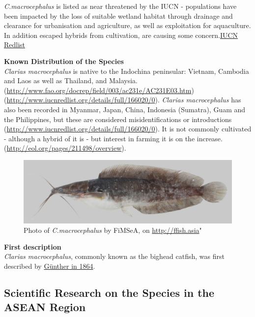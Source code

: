 \documentclass[]{book}
\theoremstyle{definition}
\theoremstyle{definition}
\theoremstyle{definition}
\theoremstyle{remark}
\begin{document}
\emph{C.macrocephalus} is listed as near threatened by the IUCN -
populations have been impacted by the loss of suitable wetland habitat
through drainage and clearance for urbanisation and agriculture, as well
as exploitation for aquaculture. In addition escaped hybrids from
cultivation, are causing some
concern.\href{http://www.iucnredlist.org/details/166020/0}{IUCN Redlist}

\textbf{Known Distribution of the Species}\\
\emph{Clarias macrocephalus} is native to the Indochina peninsular:
Vietnam, Cambodia and Laos as well as Thailand, and Malaysia.
(\url{http://www.fao.org/docrep/field/003/ac231e/AC231E03.htm})(\url{http://www.iucnredlist.org/details/full/166020/0}).
\emph{Clarias macrocephalus} has also been recorded in Myanmar, Japan,
China, Indonesia (Sumatra), Guam and the Philippines, but these are
considered misidentifications or introductions
(\url{http://www.iucnredlist.org/details/full/166020/0}). It is not
commonly cultivated - although a hybrid of it is - but interest in
farming it is on the
increase.(\url{http://eol.org/pages/211498/overview}).

\begin{figure}
\centering
\includegraphics{images_species/152_Clarias_macrocephalus_CTU-P00116.jpg}
\caption{Photo of \emph{C.macrocephalus} by FiMSeA, on
\url{http://ffish.asia}"}
\end{figure}

\textbf{First description}\\
\emph{Clarias macrocephalus}, commonly known as the bighead catfish, was
first described by \href{https://www.gbif.org/species/5202728}{Günther
in 1864}.

\hypertarget{scientific-research-on-the-species-in-the-asean-region}{%
\subsection{Scientific Research on the Species in the ASEAN
Region}\label{scientific-research-on-the-species-in-the-asean-region}}
\end{document}
